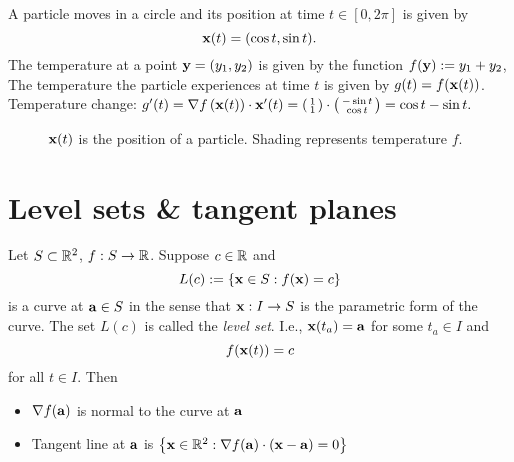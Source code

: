 \begin{example*}
    A particle moves in a circle and its position at time \(t\in [0,2\pi]\) is given by
    \[
        \xx(t) = (\cos t, \sin t).
    \]
    The temperature at a point \(\yy=(y_1,y_2)\) is given by the function \(f(\yy) := y_1 + y_2\),
    The temperature the particle experiences at time \(t\) is given by \(g(t) = f (\xx(t))\).
    Temperature change:
    \(
    g'(t)
    = \nabla f \left(\xx(t)\right) \cdot \xx'(t)
    = \left(\begin{smallmatrix}
            1 \\
            1
        \end{smallmatrix}\right)
    \cdot
    \left( \begin{smallmatrix}
            -\sin t \\
            \cos t
        \end{smallmatrix}\right)
    = \cos t - \sin t.
    \)
\end{example*}


\begin{figure}
    \begin{center}
        \caption{\(\xx(t)\) is the position of a particle. Shading represents temperature \(f\).}
    \end{center}
\end{figure}






\section{Level sets \& tangent planes}

Let \(S\subset \bR^2\), \(f:S\to\bR\).
Suppose \(c\in \bR\) and
\[
    L(c) := \left\{\xx\in S : f(\xx)=c\right\}
\]
is a curve at \(\aa \in S\) in the sense that  \(\xx:I \to S\) is the parametric form of the curve.
The set \(L(c)\) is called the \emph{level set}.
I.e., \(\xx(t_a) = \aa\) for some \(t_a \in I\) and \[f(\xx(t))=c\] for all \(t\in I\).
Then
\begin{itemize}
    \item \(\nabla f(\aa)\) is normal to the curve at \(\aa\)
    \item Tangent line at \(\aa\) is
          \(\left\{\xx\in\bR^2: \nabla f(\aa) \cdot (\xx-\aa)=0\right\}\)
\end{itemize}

